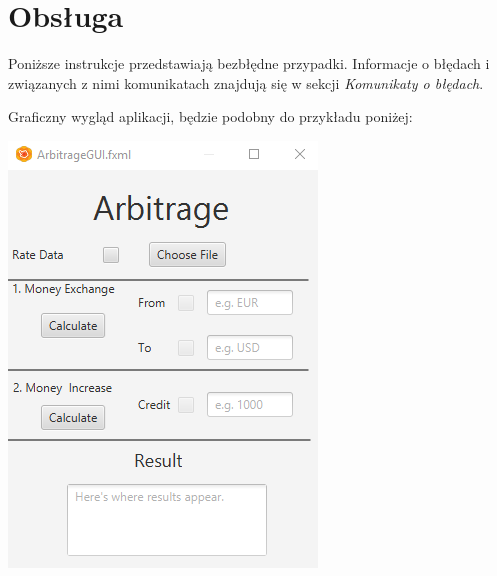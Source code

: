 \documentclass[a4paper,11pt]{article}
\begin{document}
\section{Obsługa}
Poniższe instrukcje przedstawiają bezbłędne przypadki. Informacje o błędach i związanych z nimi komunikatach znajdują się w sekcji \textit{Komunikaty o błędach}.

Graficzny wygląd aplikacji, będzie podobny do przykładu poniżej:
\begin{center}
\includegraphics[scale=1]{ArbitrageGUI}
\end{center}
\end{document}
